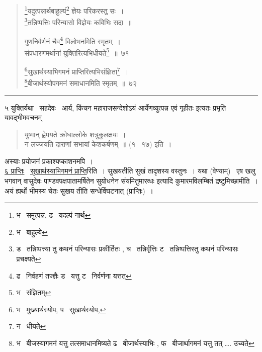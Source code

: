 \documentclass[11pt, openany]{book}
\begin{document}
\newpage

\begin{quote}
{\na \renewcommand{\thefootnote}{1}\footnote{भ \textendash\ समुत्पन्न, ढ \textendash\ यदल्पं नार्थ}यदुत्पन्नार्थबाहुल्यं\renewcommand{\thefootnote}{2}\footnote{भ \textendash\ बाहुल्ये} ज्ञेयः परिकरस्तु सः~।\\
\renewcommand{\thefootnote}{3}\footnote{ड \textendash\ तन्निष्पत्त्या तु कथनं परिन्यासः प्रकीर्तितः , च \textendash\ तन्निर्वृत्तिः ट \textendash\ तन्निष्पत्तिस्तु कथनं परिन्यासः प्रचक्ष्यते}तन्निष्पत्तिः परिन्यासो विज्ञेयः कविभिः सदा~॥

गुणनिर्वर्णनं चैव\renewcommand{\thefootnote}{4}\footnote{ढ \textendash\ निर्वहणं तज्ज्ञैः ड \textendash\ यत्तु ट \textendash\ निर्वर्णना यत्तत्} विलोभनमिति स्मृतम्~।\\
संप्रधारणमर्थानां युक्तिरित्यभिधीयते\renewcommand{\thefootnote}{5}\footnote{भ \textendash\ संज्ञितम्}~॥~७१

\renewcommand{\thefootnote}{6}\footnote{भ \textendash\ मुख्यार्थस्योप, प \textendash\ सुखार्थस्योप,}सुखार्थस्याभिगमनं प्राप्तिरित्यभिसंज्ञिता\renewcommand{\thefootnote}{7}\footnote{न \textendash\ धीयते}~।\\
\renewcommand{\thefootnote}{8}\footnote{भ \textendash\ बीजस्यागमनं यत्तु तत्समाधानमिष्यते ढ \textendash\ बीजार्थस्याभिः , फ \textendash\ बीजार्थागमनं यत्तु तत् \ldots. उच्यते}बीजार्थस्योपगमनं समाधानमिति स्मृतम्~॥~७२}
\end{quote}

\hrule

\vspace{2mm}
५ युक्तिर्यथा \textendash\ {\qt सहदेवः \textendash\ आर्य, किंचन महाराजसन्देशोऽयं आर्येणव्युत्पन्न एवं गृहीतः} इत्यतः प्रभृति यावद्भीमवचनम् \textendash

\begin{quote}
{\qt युष्मान् ह्वेपयते क्रोधाल्लोके शत्रुकुलक्षयः~।\\
न लज्जयति दाराणां सभायां केशकर्षणम्~॥} (१ \textendash\ १७) इति~।
\end{quote}

\noindent
अस्याः प्रयोजनं प्रकाश्यप्काशनमपि~।\\

\underline{६ प्राप्तिः} \textendash\ \underline{सुखार्थस्याभिगमनं प्राप्ति}रिति~। सुखयतीति सुखं तादृशस्य वस्तुनः~। यथा (वेण्याम्) \textendash\ {\qt एष खलु भगवान् वासुदेवः पाण्डवपक्षपातामर्षितेन सुयोधनेन संयमितुमारव्धः} इत्यादि कुमारमविलम्बितं द्रष्टुमिच्छामीति~। {\qt अयं ह्यर्थो भीमस्य चेतः सुखय} तीति सन्धेर्विघटनात् (प्राप्तिः)~।\\
\end{document}
